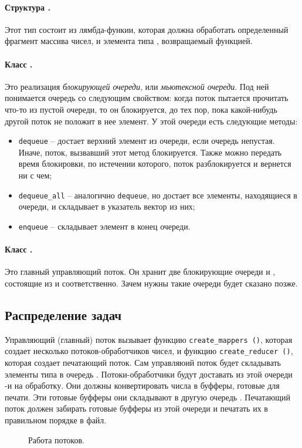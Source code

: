 \documentclass[a4paper, 12pt, twoside]{article}
\begin{document}
\paragraph{Структура \texttt{}.}
Этот тип состоит из лямбда-функии, которая должна обработать определенный фрагмент массива чисел, и элемента типа \texttt{}, возвращаемый функцией.
\paragraph{Класс \texttt{}.}
Это реализация \textit{блокирующей очереди}, или \textit{мьютексной очереди}.  
Под ней понимается очередь со следующим свойством: когда поток пытается прочитать что-то из пустой очереди, то он блокируется, до тех пор, пока какой-нибудь другой поток не положит в нее элемент.
У этой очереди есть следующие методы:
\begin{itemize}
\item \texttt{dequeue} -- достает верхний элемент из очереди, если очередь непустая.
Иначе, поток, вызвавший этот метод блокируется. Также можно передать время блокировки, по истечении которого, поток разблокируется и вернется ни с чем;
\item \texttt{dequeue\_all} -- аналогично \texttt{dequeue}, но достает все элементы, находящиеся в очереди, и складывает в указатель вектор из них;
\item \texttt{enqueue} -- складывает элемент в конец очереди.
\end{itemize}
\paragraph{Класс \texttt{}.}
Это главный управляющий поток.
Он хранит две блокирующие очереди \texttt{} и \texttt{}, состоящие из \texttt{} и \texttt{} соответственно. 
Зачем нужны такие очереди будет сказано позже.

\subsection{Распределение задач}
Управляющий (главный) поток \texttt{} вызывает функцию \texttt{create\_mappers ()}, которая создает несколько потоков-обработчиков чисел, и функцию \texttt{create\_reducer ()}, которая создает печатающий поток.
Сам управляюий поток будет складывать элементы типа \texttt{} в очередь \texttt{}.
Потоки-обработчики будут доставать из этой очереди \texttt{}-и на обработку.
Они должны конвертировать числа в буфферы, готовые для печати.
Эти готовые буфферы \texttt{} они складывают в другую очередь \texttt{}.
Печатающий поток должен забирать готовые буфферы из этой очереди и печатать их в правильном порядке в файл.
\begin{figure}[h!]
\def\svgwidth{430pt}
  
  \caption{Работа потоков.} \label{draw}
\end{figure}
\end{document}
